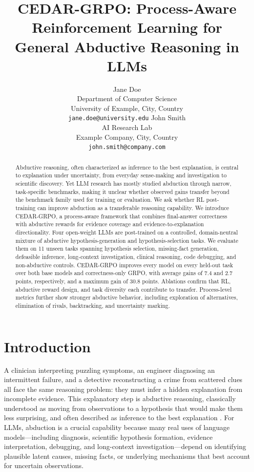 \documentclass[11pt]{article}
\title{CEDAR-GRPO: Process-Aware Reinforcement Learning for General Abductive Reasoning in LLMs}
\author{%
  Jane Doe \\
  Department of Computer Science\\
  University of Example, City, Country \\
  \texttt{jane.doe@university.edu}
  \And
  John Smith \\
  AI Research Lab\\
  Example Company, City, Country \\
  \texttt{john.smith@company.com}
}
\begin{document}
\maketitle

\begin{abstract}
Abductive reasoning, often characterized as inference to the best explanation, is central to explanation under uncertainty, from everyday sense-making and investigation to scientific discovery. Yet LLM research has mostly studied abduction through narrow, task-specific benchmarks, making it unclear whether observed gains transfer beyond the benchmark family used for training or evaluation. We ask whether RL post-training can improve abduction as a transferable reasoning capability. We introduce CEDAR-GRPO, a process-aware framework that combines final-answer correctness with abductive rewards for evidence coverage and evidence-to-explanation directionality. Four open-weight LLMs are post-trained on a controlled, domain-neutral mixture of abductive hypothesis-generation and hypothesis-selection tasks. We evaluate them on 11 unseen tasks spanning hypothesis selection, missing-fact generation, defeasible inference, long-context investigation, clinical reasoning, code debugging, and non-abductive controls. CEDAR-GRPO improves every model on every held-out task over both base models and correctness-only GRPO, with average gains of 7.4 and 2.7 points, respectively, and a maximum gain of 30.8 points. Ablations confirm that RL, abductive reward design, and task diversity each contribute to transfer. Process-level metrics further show stronger abductive behavior, including exploration of alternatives, elimination of rivals, backtracking, and uncertainty marking.
\end{abstract}


\section{Introduction}

A clinician interpreting puzzling symptoms, an engineer diagnosing an intermittent failure, and a detective reconstructing a crime from scattered clues all face the same reasoning problem: they must infer a hidden explanation from incomplete evidence. This explanatory step is abductive reasoning, classically understood as moving from observations to a hypothesis that would make them less surprising, and often described as inference to the best explanation \citep{Peirce1931,lipton2004ibe}. For LLMs, abduction is a crucial capability because many real uses of language models---including diagnosis, scientific hypothesis formation, evidence interpretation, debugging, and long-context investigation---depend on identifying plausible latent causes, missing facts, or underlying mechanisms that best account for uncertain observations.
\end{document}
